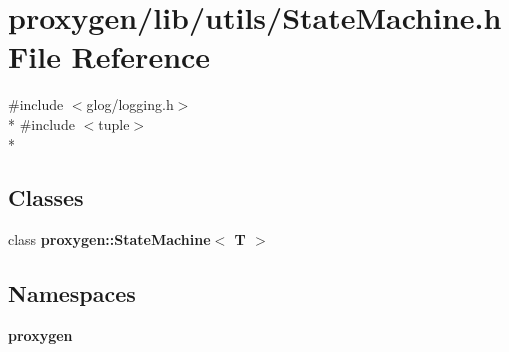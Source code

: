 \section{proxygen/lib/utils/\+State\+Machine.h File Reference}
\label{StateMachine_8h}
{\ttfamily \#include $<$glog/logging.\+h$>$}\\*
{\ttfamily \#include $<$tuple$>$}\\*
\subsection*{Classes}
\begin{DoxyCompactItemize}
\item 
class {\bf proxygen\+::\+State\+Machine$<$ T $>$}
\end{DoxyCompactItemize}
\subsection*{Namespaces}
\begin{DoxyCompactItemize}
\item 
 {\bf proxygen}
\end{DoxyCompactItemize}
